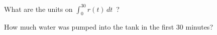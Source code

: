 \documentclass[12pt]{amsart}
\begin{document}
\begin{enumerate}
     	\vspace{.3in}
	
     	What are the units on $\displaystyle 
        \int_0^{30}r(t)\,dt$\ ?
        
    	\vspace{.3in}
	


	 How much water was pumped into the tank in the first 30
     minutes?
     
     	\vspace{.3in}
	

        
     









\end{enumerate}
\end{document}
